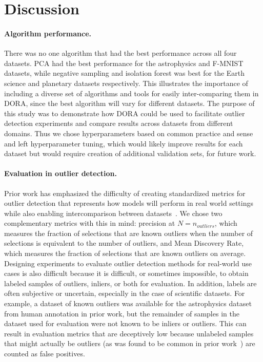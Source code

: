 \documentclass[letterpaper]{article} %
\begin{document}
\section{Discussion}

\paragraph{Algorithm performance.} 
There was no one algorithm that 
 had the best performance across all four datasets. PCA had
the best performance for the astrophysics and F-MNIST datasets, 
while negative sampling and isolation forest was best for
the Earth science and planetary datasets respectively. This illustrates
the importance of including a diverse set of algorithms and tools for
easily inter-comparing them in DORA, since the best
algorithm will vary for different datasets. The purpose of this study
was to demonstrate how DORA could be used to facilitate 
outlier detection experiments and compare results across datasets from 
different domains. Thus we chose hyperparameters based on common 
practice and sense and left hyperparameter tuning, which would likely 
improve results for each dataset but would require
creation of additional validation sets, for future work.
 
\paragraph{Evaluation in outlier detection.} 
Prior work has emphasized
the difficulty of creating standardized metrics for outlier detection that 
represents how models will perform in real world settings while also enabling
intercomparison between datasets~\cite{campos2016evaluation}. We chose two
complementary metrics with this in mind: precision at $N=n_{outliers}$, which
measures the fraction of selections that are known outliers when the number of
selections is equivalent to the number of outliers, and
 Mean Discovery Rate, which measures the fraction of selections that are known outliers on average. 
Designing experiments to evaluate outlier detection methods for real-world
use cases is also difficult because it is difficult, or sometimes impossible, 
to obtain labeled samples of outliers, inliers, or both for evaluation. 
In addition, labels are often subjective or uncertain, 
especially in the case of scientific datasets. For example, a dataset of known
outliers was available for the astrophysics dataset from human annotation
in prior work, but the remainder of samples in the dataset used for evaluation
were not known to be inliers or outliers. This can result in evaluation metrics
 that are deceptively low because unlabeled samples that might actually be
 outliers (as was found to be common in prior work~\cite{wagstaff:des-anom20})
 are counted as false positives. 
\end{document}
